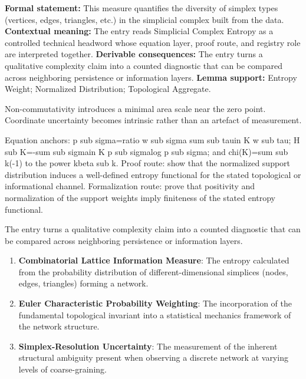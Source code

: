 \begingroup\footnotesize\setlength{\emergencystretch}{3em}\sloppy
\textbf{Formal statement:} This measure quantifies the diversity of simplex types (vertices, edges, triangles, etc.) in the simplicial complex built from the data. \textbf{Contextual meaning:} The entry reads Simplicial Complex Entropy as a controlled technical headword whose equation layer, proof route, and registry role are interpreted together. \textbf{Derivable consequences:} The entry turns a qualitative complexity claim into a counted diagnostic that can be compared across neighboring persistence or information layers. \textbf{Lemma support:} Entropy Weight; Normalized Distribution; Topological Aggregate.\par
\endgroup

Non-commutativity introduces a minimal area scale near the zero point. Coordinate uncertainty becomes intrinsic rather than an artefact of measurement.

Equation anchors: p sub sigma=ratio w sub sigma sum sub tauin K w sub tau; H sub K=-sum sub sigmain K p sub sigmalog p sub sigma; and chi(K)=sum sub k(-1) to the power kbeta sub k. Proof route: show that the normalized support distribution induces a well-defined entropy functional for the stated topological or informational channel. Formalization route: prove that positivity and normalization of the support weights imply finiteness of the stated entropy functional.

The entry turns a qualitative complexity claim into a counted diagnostic that can be compared across neighboring persistence or information layers.
\endgroup

\begin{enumerate}[leftmargin=1.6em,itemsep=6pt,topsep=4pt]
\item \textbf{Combinatorial Lattice Information Measure}: The entropy calculated from the probability distribution of different-dimensional simplices (nodes, edges, triangles) forming a network.
\item \textbf{Euler Characteristic Probability Weighting}: The incorporation of the fundamental topological invariant into a statistical mechanics framework of the network structure.
\item \textbf{Simplex-Resolution Uncertainty}: The measurement of the inherent structural ambiguity present when observing a discrete network at varying levels of coarse-graining.
\end{enumerate}

